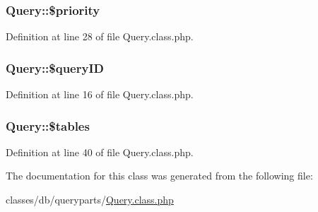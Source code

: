 \subsubsection[{\texorpdfstring{\$priority}{$priority}}]{\setlength{\rightskip}{0pt plus 5cm}Query\+::\$priority}\hypertarget{classQuery_a4d64f61fd525a70ebc2aaa6ab8291e20}{}\label{classQuery_a4d64f61fd525a70ebc2aaa6ab8291e20}


Definition at line 28 of file Query.\+class.\+php.

\subsubsection[{\texorpdfstring{\$query\+ID}{$queryID}}]{\setlength{\rightskip}{0pt plus 5cm}Query\+::\$query\+ID}\hypertarget{classQuery_a67666b2fcd6c60e73d8329f7d22044dc}{}\label{classQuery_a67666b2fcd6c60e73d8329f7d22044dc}


Definition at line 16 of file Query.\+class.\+php.

\subsubsection[{\texorpdfstring{\$tables}{$tables}}]{\setlength{\rightskip}{0pt plus 5cm}Query\+::\$tables}\hypertarget{classQuery_a5c74163d1615b141456b123c11fa9d92}{}\label{classQuery_a5c74163d1615b141456b123c11fa9d92}


Definition at line 40 of file Query.\+class.\+php.



The documentation for this class was generated from the following file\+:\begin{DoxyCompactItemize}
\item 
classes/db/queryparts/\hyperlink{Query_8class_8php}{Query.\+class.\+php}\end{DoxyCompactItemize}
